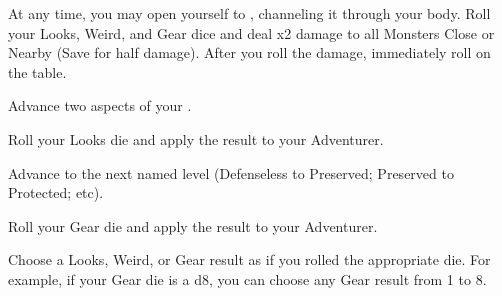 \begin{multicols*}{2}


At any time, you may open yourself to , channeling it through your body. Roll your Looks, Weird, and Gear dice and deal \SUM x2 damage to all Monsters Close or Nearby (Save for half damage). After you roll the damage, immediately roll on the  table.


Advance two  aspects of your  \DCUP.



Roll your Looks die and apply the result to your Adventurer.

\cbreak


Advance   to the next named level (Defenseless to Preserved; Preserved to Protected; etc).


Roll your Gear die and apply the result to your Adventurer.


Choose a Looks, Weird, or Gear result as if you rolled the appropriate die.  For example, if your Gear die is a d8, you can choose any Gear result from 1 to 8.

\end{multicols*}
